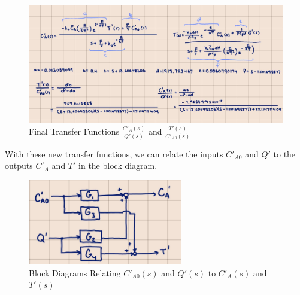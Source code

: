 \documentclass[12pt]{article}
\begin{document}
\begin{enumerate}
\begin{enumerate}
    \begin{figure}[H]
      \centering
      \includegraphics[width=\textwidth]{Figures/handcalc/figure4-4d.png}
      \caption{Final Transfer Functions $\frac{C'_A(s)}{Q'(s)}$ and $\frac{T'(s)}{C'_{A0}(s)}$}
      \label{fig:figure48}
    \end{figure}
    
    \pagebreak

    With these new transfer functions, we can relate the inputs $C'_{A0}$ and $Q'$ to the outputs $C'_A$ and $T'$ in the block diagram.

    \begin{figure}[H]
      \centering
      \includegraphics[width=0.6\textwidth]{Figures/handcalc/figure4-4e.png}
      \caption{Block Diagrams Relating $C'_{A0}(s)$ and $Q'(s)$ to $C'_A(s)$ and $T'(s)$}
      \label{fig:figure49}
    \end{figure}


  \end{enumerate}

\end{enumerate}
\end{document}
